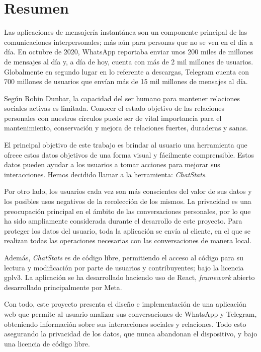 \cleardoublepage
{}
\chapter*{Resumen}

Las aplicaciones de mensajería instantánea son un componente principal de las comunicaciones interpersonales; más aún para personas que no se ven en el día a día. En octubre de 2020, WhatsApp reportaba enviar unos 200 miles de millones de mensajes al día \cite{whatsAppsPerDay} y, a día de hoy, cuenta con más de 2 mil millones de usuarios.\cite{whatsAppsUsers} Globalmente en segundo lugar en lo referente a descargas, Telegram cuenta con 700 millones de usuarios \cite{telegramSecondPlaceGlobally} que envían más de 15 mil millones de mensajes al día. \cite{telegramMessagesPerDay}

Según Robin Dunbar, la capacidad del ser humano para mantener relaciones sociales activas es limitada.\cite{dunbarNumber} Conocer el estado objetivo de las relaciones personales con nuestros círculos puede ser de vital importancia para el mantenimiento, conservación y mejora de relaciones fuertes, duraderas y sanas.

El principal objetivo de este trabajo es brindar al usuario una herramienta que ofrece estos datos objetivos de una forma visual y fácilmente comprensible. Estos datos pueden ayudar a los usuarios a tomar acciones para mejorar sus interacciones. Hemos decidido llamar a la herramienta: \textit{ChatStats}.

Por otro lado, los usuarios cada vez son más conscientes del valor de sus datos y los posibles usos negativos de la recolección de los mismos. La privacidad es una preocupación principal en el ámbito de las conversaciones personales, por lo que ha sido ampliamente considerada durante el desarrollo de este proyecto. Para proteger los datos del usuario, toda la aplicación se envía al cliente, en el que se realizan todas las operaciones necesarias con las conversaciones de manera local. 

Además, \textit{ChatStats} es de código libre, permitiendo el acceso al código para su lectura y modificación por parte de usuarios y contribuyentes; bajo la licencia \acrfull{gplv3}.\cite{GPLv3} La aplicación se ha desarrollado haciendo uso de React, \textit{framework} abierto desarrollado principalmente por Meta.

Con todo, este proyecto presenta el diseño e implementación de una aplicación web que permite al usuario analizar sus conversaciones de WhatsApp y Telegram, obteniendo información sobre sus interacciones sociales y relaciones. Todo esto asegurando la privacidad de los datos, que nunca abandonan el dispositivo, y bajo una licencia de código libre.

